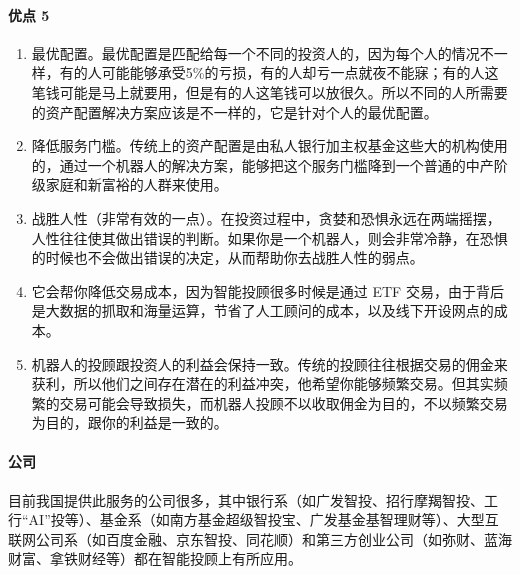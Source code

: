 \documentclass[letterpaper,10pt,english]{sphinxmanual}
\begin{document}
\paragraph{优点 5\sphinxfootnotemark[1110]}
\label{\detokenize{chapter_AI+Finance/Robo-Advisor:id7}}%
\begin{footnotetext}[1110]\sphinxAtStartFootnote
{}
%
\end{footnotetext}\ignorespaces \begin{enumerate}
%
\item {} 
最优配置。最优配置是匹配给每一个不同的投资人的，因为每个人的情况不一样，有的人可能能够承受5\%的亏损，有的人却亏一点就夜不能寐；有的人这笔钱可能是马上就要用，但是有的人这笔钱可以放很久。所以不同的人所需要的资产配置解决方案应该是不一样的，它是针对个人的最优配置。

\item {} 
降低服务门槛。传统上的资产配置是由私人银行加主权基金这些大的机构使用的，通过一个机器人的解决方案，能够把这个服务门槛降到一个普通的中产阶级家庭和新富裕的人群来使用。

\item {} 
战胜人性（非常有效的一点）。在投资过程中，贪婪和恐惧永远在两端摇摆，人性往往使其做出错误的判断。如果你是一个机器人，则会非常冷静，在恐惧的时候也不会做出错误的决定，从而帮助你去战胜人性的弱点。

\item {} 
它会帮你降低交易成本，因为智能投顾很多时候是通过 ETF
交易，由于背后是大数据的抓取和海量运算，节省了人工顾问的成本，以及线下开设网点的成本。

\item {} 
机器人的投顾跟投资人的利益会保持一致。传统的投顾往往根据交易的佣金来获利，所以他们之间存在潜在的利益冲突，他希望你能够频繁交易。但其实频繁的交易可能会导致损失，而机器人投顾不以收取佣金为目的，不以频繁交易为目的，跟你的利益是一致的。

\end{enumerate}


\paragraph{公司}
\label{\detokenize{chapter_AI+Finance/Robo-Advisor:id8}}
目前我国提供此服务的公司很多，其中银行系（如广发智投、招行摩羯智投、工行“AI”投等）、基金系（如南方基金超级智投宝、广发基金基智理财等）、大型互联网公司系（如百度金融、京东智投、同花顺）和第三方创业公司（如弥财、蓝海财富、拿铁财经等）都在智能投顾上有所应用。%
\begin{footnote}[1111]\sphinxAtStartFootnote
{}
%
\end{footnote}
\end{document}
